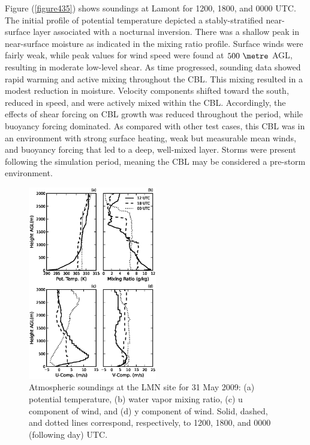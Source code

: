 Figure (\autoref{figure435}) shows soundings at Lamont for 1200, 1800, and 0000 UTC. The initial profile of potential temperature depicted a stably-stratified near-surface layer associated with a nocturnal inversion. There was a shallow peak in near-surface moisture as indicated in the mixing ratio profile. Surface winds were fairly weak, while peak values for wind speed were found at $500\mbox{ }\metre$ AGL, resulting in moderate low-level shear. As time progressed, sounding data showed rapid warming and active mixing throughout the CBL. This mixing resulted in a modest reduction in moisture. Velocity components shifted toward the south, reduced in speed, and were actively mixed within the CBL. Accordingly, the effects of shear forcing on CBL growth was reduced throughout the period, while buoyancy forcing dominated. As compared with other test cases, this CBL was in an environment with strong surface heating, weak but measurable mean winds, and buoyancy forcing that led to a deep, well-mixed layer. Storms were present following the simulation period, meaning the CBL may be considered a pre-storm environment. 


\begin{figure}[H]
\begin{center}
\includegraphics[width=0.5\textwidth]{figures/chapter4/20090531_lmnsounding}
\end{center}
\caption{Atmospheric soundings at the LMN site for 31 May 2009: (a) potential temperature, (b) water vapor mixing ratio, (c) u component of wind, and (d) y component of wind. Solid, dashed, and dotted lines correspond, respectively, to 1200, 1800, and 0000 (following day) UTC.}
\label{figure435}
\end{figure}


